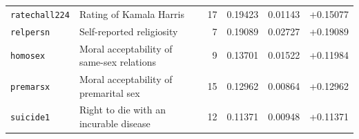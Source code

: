 \begin{table}[!t]
\begin{tabularx}{\linewidth}{@{}lXrrrr@{}}
\texttt{ratechall224} & Rating of Kamala Harris & 17 & 0.19423 & 0.01143 & +0.15077\\
\texttt{relpersn} & Self-reported religiosity & 7 & 0.19089 & 0.02727 & +0.19089\\
\texttt{homosex} & Moral acceptability of same-sex relations & 9 & 0.13701 & 0.01522 & +0.11984\\
\texttt{premarsx} & Moral acceptability of premarital sex & 15 & 0.12962 & 0.00864 & +0.12962\\
\texttt{suicide1} & Right to die with an incurable disease & 12 & 0.11371 & 0.00948 & +0.11371\\
\bottomrule
\end{tabularx}
\end{table}
